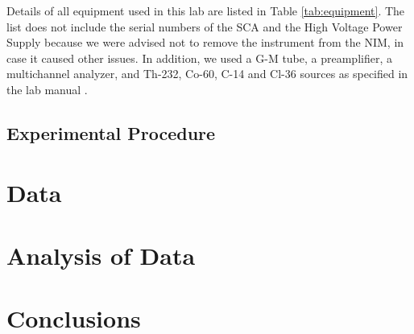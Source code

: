 \documentclass[12pt]{article}
\begin{document}
Details of all equipment used in this lab are listed in Table \ref{tab:equipment}. The list does not include the serial numbers of the SCA and the High Voltage Power Supply because we were advised not to remove the instrument from the NIM, in case it caused other issues. In addition, we used a G-M tube, a preamplifier, a multichannel analyzer, and Th-232, Co-60, C-14 and Cl-36 sources as specified in the lab manual \cite{labmanual}.

\begin{table}[H]
    \centering
    \caption{List of equipment used in Laboratory 4.}
    \label{tab:equipment}
\end{table}

\subsection{Experimental Procedure}



\section{Data}



\section{Analysis of Data}



\section{Conclusions}


\nocite{knoll,labmanual,lab2} %

\end{document}

